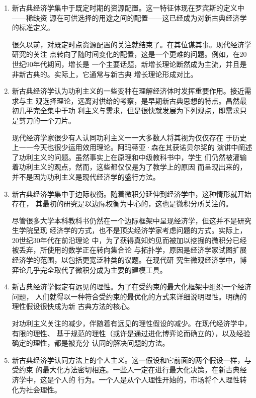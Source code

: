 \begin{enumerate}
\item 新古典经济学集中于既定时期的资源配置。这一特征体现在罗宾斯的定义中——稀缺资
  源在可供选择的用途之间的配置——这已经成为对新古典经济学的标准定义。

  很久以前，对既定时点资源配置的关注就结束了。在其位谋其事。现代经济学研究的关注
  点转向了随时间变化的配置，这是一个更难的问题。例如，在20世纪90年代期间，增长是
  一个主要话题，新增长理论断然成为主流，并且是非新古典的。实际上，它通常与新古典
  增长理论形成对比。

\item 新古典经济学认为功利主义的一些变种在理解经济体时发挥重要作用。接近需求与主
  观选择理论，远离对供给的考察，是早期新古典思想的特点。昌然最初几平完全集中于功
  利主义与需求，但是很快就发展为下列观点，即需求只是剪刀的一个刀片。

  现代经济学家很少有人认同功利主义一一大多数人将其视为仅仅存在
  于历史上一一今天也很少运用效用理论。阿玛蒂亚·森在其获诺贝尔奖的
  演讲中阐述了功利主义的问题。虽然事实上在原理和中级教科书中，学生
  们仍然被灌输着功利主义的观点，然而，这些都仅仅是为了教学上的原因
  而呈现出来的，并不是因为功利主义是现代经济学的盛行方法。

\item 新古典经济学集中于边际权衡。随着微积分延伸到经济学中，这种情形就开始存在，
  其最初的研究是以边际权衡为中心的，这也是微积分所关注的。

  尽管很多大学本科教科书仍然在一个边际框架中呈现经济学，但这并不是研究生学院呈现
  经济学的方式，也不是顶尖经济学家考虑问题的方式。实际上，20世纪30年代在前沿理论
  中，为了获得真知灼见而被加以挖掘的微积分已经被丢弃，所使用的数学正在转向集合论
  与拓扑学，原因是经济学家试图扩展经济学的范围，以包括更宽泛种类的议题。在现代研
  究生微观经济学中，博弈论几乎完全取代了微积分成为主要的建模工具。

\item 新古典经济学假定有远见的理性。为了在受约束的最大化框架中组织一个经济问题，
  人们就得以一种符合受约束的最优化的方式来详细说明理性。明确的理性假设很快成为新
  古典方法的核心。

  对功利主义关注的减少，伴随着有远见的理性假设的减少。在现代经济学中，有限的理性、
  基于规范的理性（或许是通过进化博弈论而确立的），以及经验确定的理性，都是被充分
  认同的解决问题的方法。


\item 新古典经济学认同方法上的个人主义。这一假设和它前面的两个假设一样，与受约束
  的最大化方法密切相连。一些人一定在进行最大化决策，在新古典经济学中，这是个人的
  行为。一个人是从个人理性开始的，市场将个人理性转化为社会理性。


\end{enumerate}
